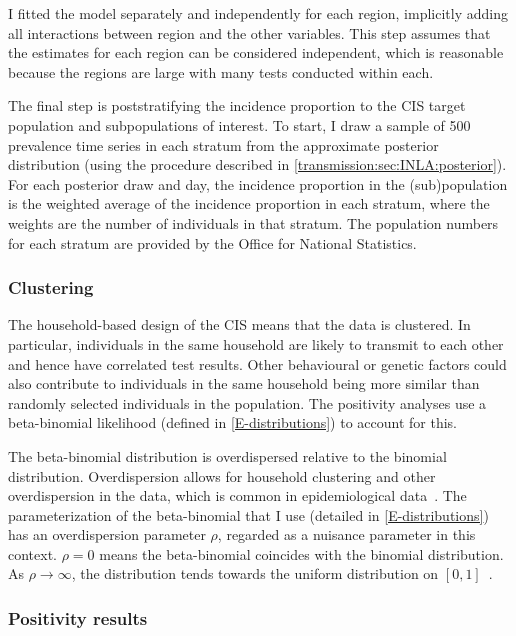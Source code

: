 \documentclass[thesis.tex]{subfiles}
\begin{document}
I fitted the model separately and independently for each region, implicitly adding all interactions between region and the other variables.
This step assumes that the estimates for each region can be considered independent, which is reasonable because the regions are large with many tests conducted within each.

The final step is poststratifying the incidence proportion to the CIS target population and subpopulations of interest.
To start, I draw a sample of 500 prevalence time series in each stratum from the approximate posterior distribution (using the procedure described in \cref{transmission:sec:INLA:posterior}).
For each posterior draw and day, the incidence proportion in the (sub)population is the weighted average of the incidence proportion in each stratum, where the weights are the number of individuals in that stratum.
The population numbers for each stratum are provided by the Office for National Statistics.

\subsubsection{Clustering} \label{biology-data:sec:clustering}

The household-based design of the CIS means that the data is clustered.
In particular, individuals in the same household are likely to transmit to each other and hence have correlated test results.
Other behavioural or genetic factors could also contribute to individuals in the same household being more similar than randomly selected individuals in the population.
The positivity analyses use a beta-binomial likelihood (defined in \cref{E-distributions}) to account for this.

The beta-binomial distribution is overdispersed relative to the binomial distribution.
Overdispersion allows for household clustering and other overdispersion in the data, which is common in epidemiological data~\autocite{griffithsBBD}.
The parameterization of the beta-binomial that I use (detailed in \cref{E-distributions}) has an overdispersion parameter $\rho$, regarded as a nuisance parameter in this context.
$\rho=0$ means the beta-binomial coincides with the binomial distribution.
As $\rho \to \infty$, the distribution tends towards the uniform distribution on $[0, 1]$~\autocite{hughesUsing}.

\subsubsection{Positivity results} \label{biology-data:sec:positivity-results}
\end{document}
